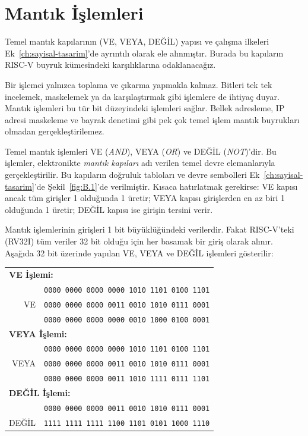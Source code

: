 \section{Mantık İşlemleri}
\label{sec:mantik-islemleri}

Temel mantık kapılarının (VE, VEYA, DEĞİL) yapısı ve çalışma ilkeleri Ek~\ref{ch:sayisal-tasarim}'de ayrıntılı olarak ele alınmıştır. Burada bu kapıların RISC-V buyruk kümesindeki karşılıklarına odaklanacağız.

Bir işlemci yalnızca toplama ve çıkarma yapmakla kalmaz. Bitleri tek tek incelemek, maskelemek ya da karşılaştırmak gibi işlemlere de ihtiyaç duyar. Mantık işlemleri bu tür bit düzeyindeki işlemleri sağlar. Bellek adresleme, IP adresi maskeleme ve bayrak denetimi gibi pek çok temel işlem mantık buyrukları olmadan gerçekleştirilemez.

Temel mantık işlemleri VE (\emph{AND}), VEYA (\emph{OR}) ve DEĞİL (\emph{NOT})'dir. Bu işlemler, elektronikte \emph{mantık kapıları} adı verilen temel devre elemanlarıyla gerçekleştirilir. Bu kapıların doğruluk tabloları ve devre sembolleri Ek~\ref{ch:sayisal-tasarim}'de Şekil~\ref{fig:B.1}'de verilmiştir. Kısaca hatırlatmak gerekirse: VE kapısı ancak tüm girişler 1 olduğunda 1 üretir; VEYA kapısı girişlerden en az biri 1 olduğunda 1 üretir; DEĞİL kapısı ise girişin tersini verir.

Mantık işlemlerinin girişleri 1 bit büyüklüğündeki verilerdir. Fakat RISC-V'teki (RV32I) tüm veriler 32 bit olduğu için her basamak bir giriş olarak alınır. Aşağıda 32 bit üzerinde yapılan VE, VEYA ve DEĞİL işlemleri gösterilir:

\begin{center}
\small
\begin{tabular}{r@{\;\;}l}
  \multicolumn{2}{l}{\textbf{VE İşlemi:}} \\[4pt]
  & \texttt{0000\,0000\,0000\,0000\,1010\,1101\,0100\,1101} \\
  VE & \texttt{0000\,0000\,0000\,0011\,0010\,1010\,0111\,0001} \\
  \midrule
  & \texttt{0000\,0000\,0000\,0000\,0010\,1000\,0100\,0001} \\[12pt]
  \multicolumn{2}{l}{\textbf{VEYA İşlemi:}} \\[4pt]
  & \texttt{0000\,0000\,0000\,0000\,1010\,1101\,0100\,1101} \\
  VEYA & \texttt{0000\,0000\,0000\,0011\,0010\,1010\,0111\,0001} \\
  \midrule
  & \texttt{0000\,0000\,0000\,0011\,1010\,1111\,0111\,1101} \\[12pt]
  \multicolumn{2}{l}{\textbf{DEĞİL İşlemi:}} \\[4pt]
  & \texttt{0000\,0000\,0000\,0011\,0010\,1010\,0111\,0001} \\
  \midrule
  DEĞİL & \texttt{1111\,1111\,1111\,1100\,1101\,0101\,1000\,1110} \\
\end{tabular}
\end{center}

